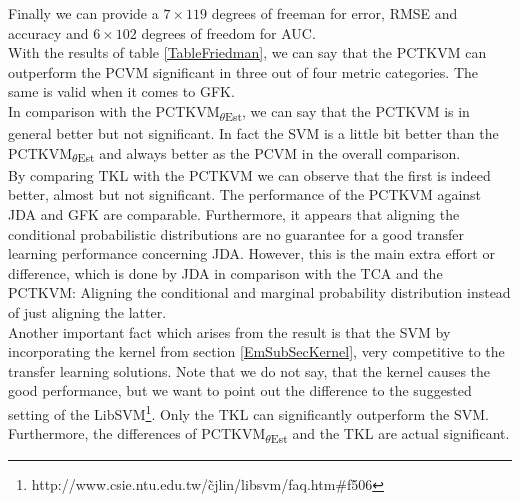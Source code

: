 Finally we can provide a $7\times 119$ degrees of freeman for error, \acs{RMSE} and accuracy and $6\times102$ degrees of freedom for \acs{AUC}.\\
With the results of table \ref{TableFriedman}, we can say that the \acs{PCTKVM} can outperform the \acs{PCVM} significant in three out of four metric categories. The same is valid when it comes to \acs{GFK}.\\
In comparison with the \acs{PCTKVM}\textsubscript{$\theta$Est}, we can say that the \acs{PCTKVM} is in general better but not significant.
In fact the \acs{SVM} is a little bit better than the \acs{PCTKVM}\textsubscript{$\theta$Est} and always better as the \acs{PCVM} in the overall comparison.\\
By comparing \acs{TKL} with the \acs{PCTKVM} we can observe that the first is indeed better, almost but not significant.
The performance of the \acs{PCTKVM} against \acs{JDA} and \acs{GFK} are comparable.
Furthermore, it appears that aligning the conditional probabilistic distributions are no guarantee for a good transfer learning performance concerning \acs{JDA}. However, this is the main extra effort or difference, which is done by \acs{JDA} in comparison with the \acs{TCA} and the \acs{PCTKVM}: Aligning the conditional and marginal probability distribution instead of just aligning the latter.\cite{Long.}\cite{Pan.2011}\cite{Long.2015}\\
Another important fact which arises from the result is that the \acs{SVM} by incorporating the kernel from section \ref{EmSubSecKernel}, very competitive to the transfer learning solutions.
Note that we do not say, that the kernel causes the good performance, but we want to point out the difference to the suggested setting of the LibSVM\footnote{http://www.csie.ntu.edu.tw/\~cjlin/libsvm/faq.htm\#f506}.
Only the \acs{TKL} can significantly outperform the \acs{SVM}.
Furthermore, the differences of \acs{PCTKVM}\textsubscript{$\theta$Est} and the \acs{TKL} are actual significant. 

\begin{table}[]
	\centering
	\caption[Mean Ranks under the Perfomance Metrics]{The Mean Rank of the tested classifiers under the Metrics ERR, AUC, and RMSE.	\label{TableMeanRank}}

\end{table}

